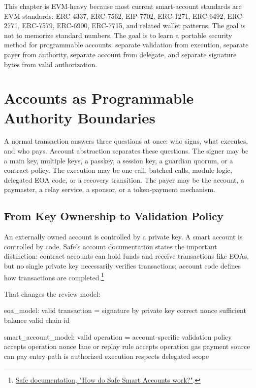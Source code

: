 This chapter is EVM-heavy because most current smart-account standards are EVM standards: ERC-4337, ERC-7562, EIP-7702, ERC-1271, ERC-6492, ERC-2771, ERC-7579, ERC-6900, ERC-7715, and related wallet patterns. The goal is not to memorize standard numbers. The goal is to learn a portable security method for programmable accounts: separate validation from execution, separate payer from authority, separate account from delegate, and separate signature bytes from valid authorization.

\section{Accounts as Programmable Authority Boundaries}

A normal transaction answers three questions at once: who signs, what executes, and who pays. Account abstraction separates these questions. The signer may be a main key, multiple keys, a passkey, a session key, a guardian quorum, or a contract policy. The execution may be one call, batched calls, module logic, delegated EOA code, or a recovery transition. The payer may be the account, a paymaster, a relay service, a sponsor, or a token-payment mechanism.

\subsection{From Key Ownership to Validation Policy}

An externally owned account is controlled by a private key. A smart account is controlled by code. Safe's account documentation states the important distinction: contract accounts can hold funds and receive transactions like EOAs, but no single private key necessarily verifies transactions; account code defines how transactions are completed.\footnote{\href{https://docs.safe.global/advanced/smart-account-overview}{Safe documentation, "How do Safe Smart Accounts work?"}.}

That changes the review model:

\begin{codeblock}
eoa_model:
    valid transaction =
        signature by private key
        correct nonce
        sufficient balance
        valid chain id

smart_account_model:
    valid operation =
        account-specific validation policy accepts operation
        nonce lane or replay rule accepts operation
        gas payment source can pay
        entry path is authorized
        execution respects delegated scope
\end{codeblock}

